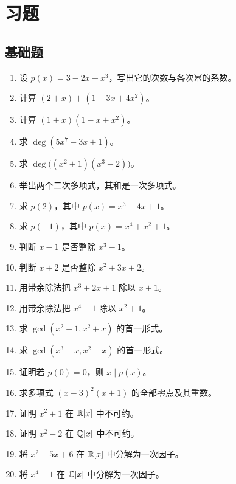 \section*{习题}

\subsection*{基础题}
\begin{enumerate}[label=\textbf{\arabic*.}, leftmargin=*, itemsep=0.5em]
\item \basic 设 $p(x)=3-2x+x^3$，写出它的次数与各次幂的系数。
\item \basic 计算 $(2+x)+(1-3x+4x^2)$。
\item \basic 计算 $(1+x)(1-x+x^2)$。
\item \basic 求 $\deg(5x^7-3x+1)$。
\item \basic 求 $\deg\big((x^2+1)(x^3-2)\big)$。
\item \basic 举出两个二次多项式，其和是一次多项式。
\item \basic 求 $p(2)$，其中 $p(x)=x^3-4x+1$。
\item \basic 求 $p(-1)$，其中 $p(x)=x^4+x^2+1$。
\item \basic 判断 $x-1$ 是否整除 $x^3-1$。
\item \basic 判断 $x+2$ 是否整除 $x^2+3x+2$。
\item \basic 用带余除法把 $x^3+2x+1$ 除以 $x+1$。
\item \basic 用带余除法把 $x^4-1$ 除以 $x^2+1$。
\item \basic 求 $\gcd(x^2-1,x^2+x)$ 的首一形式。
\item \basic 求 $\gcd(x^3-x,x^2-x)$ 的首一形式。
\item \basic 证明若 $p(0)=0$，则 $x\mid p(x)$。
\item \basic 求多项式 $(x-3)^2(x+1)$ 的全部零点及其重数。
\item \basic 证明 $x^2+1$ 在 $\mathbb{R}[x]$ 中不可约。
\item \basic 证明 $x^2-2$ 在 $\mathbb{Q}[x]$ 中不可约。
\item \basic 将 $x^2-5x+6$ 在 $\mathbb{R}[x]$ 中分解为一次因子。
\item \basic 将 $x^4-1$ 在 $\mathbb{C}[x]$ 中分解为一次因子。
\end{enumerate}

